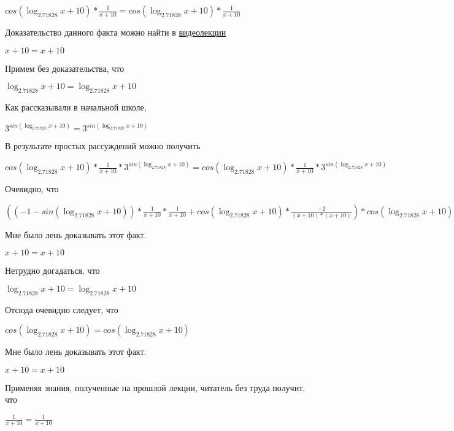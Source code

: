 \documentclass[12pt,a4paper,fleqn]{article}
\theoremstyle{definition}
\begin{document}
$cos(\log_{ 2.71828 }{ x  +  10 }) * \frac{ 1 }{ x  +  10 }
 = cos(\log_{ 2.71828 }{ x  +  10 }) * \frac{ 1 }{ x  +  10 }
$

Доказательство данного факта можно найти в \href{https://www.youtube.com/watch?v=dQw4w9WgXcQ}{видеолекции} 

$ x  +  10  =  x  +  10 $

Примем без доказательства, что 

$\log_{ 2.71828 }{ x  +  10 } = \log_{ 2.71828 }{ x  +  10 }$

Как рассказывали в начальной школе, 

${ 3 }^{sin(\log_{ 2.71828 }{ x  +  10 })} = { 3 }^{sin(\log_{ 2.71828 }{ x  +  10 })}$

В результате простых рассуждений можно получить 

$cos(\log_{ 2.71828 }{ x  +  10 }) * \frac{ 1 }{ x  +  10 }
 * { 3 }^{sin(\log_{ 2.71828 }{ x  +  10 })} = cos(\log_{ 2.71828 }{ x  +  10 }) * \frac{ 1 }{ x  +  10 }
 * { 3 }^{sin(\log_{ 2.71828 }{ x  +  10 })}$

Очевидно, что 

$(( -1  - sin(\log_{ 2.71828 }{ x  +  10 })) * \frac{ 1 }{ x  +  10 }
 * \frac{ 1 }{ x  +  10 }
 + cos(\log_{ 2.71828 }{ x  +  10 }) * \frac{ -2 }{( x  +  10 ) * ( x  +  10 )}
) * cos(\log_{ 2.71828 }{ x  +  10 }) * \frac{ 1 }{ x  +  10 }
 * { 3 }^{sin(\log_{ 2.71828 }{ x  +  10 })} = (( -1  - sin(\log_{ 2.71828 }{ x  +  10 })) * \frac{ 1 }{ x  +  10 }
 * \frac{ 1 }{ x  +  10 }
 + cos(\log_{ 2.71828 }{ x  +  10 }) * \frac{ -2 }{( x  +  10 ) * ( x  +  10 )}
) * cos(\log_{ 2.71828 }{ x  +  10 }) * \frac{ 1 }{ x  +  10 }
 * { 3 }^{sin(\log_{ 2.71828 }{ x  +  10 })}$

Мне было лень доказывать этот факт.

$ x  +  10  =  x  +  10 $

Нетрудно догадаться, что 

$\log_{ 2.71828 }{ x  +  10 } = \log_{ 2.71828 }{ x  +  10 }$

Отсюда очевидно следует, что 

$cos(\log_{ 2.71828 }{ x  +  10 }) = cos(\log_{ 2.71828 }{ x  +  10 })$

Мне было лень доказывать этот факт.

$ x  +  10  =  x  +  10 $

Применяя знания, полученные на прошлой лекции, читатель без труда получит, что 

$\frac{ 1 }{ x  +  10 }
 = \frac{ 1 }{ x  +  10 }
$
\end{document}
